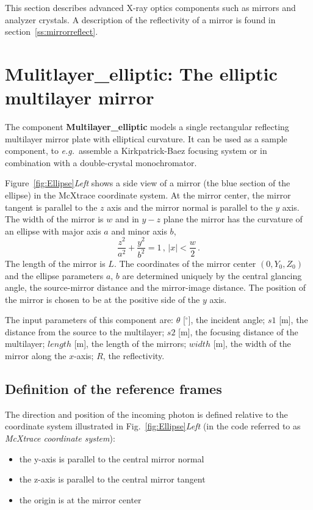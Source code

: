

This section describes advanced X-ray optics
components such as mirrors and analyzer crystals.
A description of the reflectivity of a mirror is found
in section~\ref{ss:mirrorreflect}.

\section{Mulitlayer\_elliptic: The elliptic multilayer mirror}
\label{s:mirror}

The component \textbf{Multilayer\_elliptic}
models a single rectangular reflecting multilayer mirror plate with elliptical curvature. It can be used
as a sample component, to \textit{e.g.}~assemble a Kirkpatrick-Baez focusing system 
or in combination with a double-crystal monochromator.


Figure~\ref{fig:Ellipse}\emph{Left} shows a side view of a mirror
(the blue section of the ellipse) in the McXtrace coordinate system.
At the mirror center, the mirror tangent is parallel to the $z$ axis
and the mirror normal is parallel to the $y$ axis. The width of the
mirror is $w$ and in $y-z$ plane the mirror has the curvature of an
ellipse with major axis $a$ and minor axis $b$,
%
\begin{equation} 
\frac{z^2}{ a^2} + \frac{y^2}{b^2} =1\,, \,|x| <
\frac{w}{2}\,.
\end{equation}
%
The length of the mirror is $L$. The coordinates of the mirror
center $(0,Y_0,Z_0)$ and the ellipse parameters $a$, $b$ are
determined uniquely by the central glancing angle, the source-mirror
distance and the mirror-image distance. The position of the mirror
is chosen to be at the positive side of the $y$ axis.

The input parameters of this component are:
$\theta$ [$^{\circ}$], the incident angle; 
$s1$ [m], the distance from the source to the multilayer;
$s2$ [m], the focusing distance of the multilayer;
$length$ [m], the length of the mirrors;
$width$ [m], the width of the mirror along the $x$-axis;
$R$, the reflectivity.

\subsection{Definition of the reference frames}
The direction and position of the incoming photon is defined
relative to the coordinate system illustrated in
Fig.~\ref{fig:Ellipse}\emph{Left} (in the code referred to as
\emph{McXtrace coordinate system}):
\begin{itemize}
\item the y-axis is parallel to the central mirror normal
\item the z-axis is parallel to the central mirror tangent
\item the origin is at the mirror center
\end{itemize}

